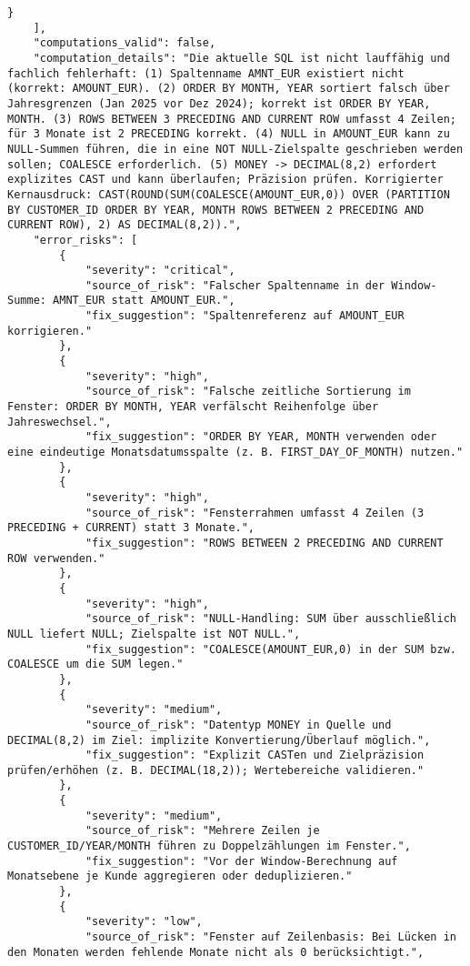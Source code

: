 \begin{lstlisting}[caption={Ausgabe: GPT-5 Anwendungsfall 8 Konsistenzdurchlauf},label={gpt_case8_prompt2}]
        }
    ],
    "computations_valid": false,
    "computation_details": "Die aktuelle SQL ist nicht lauffähig und fachlich fehlerhaft: (1) Spaltenname AMNT_EUR existiert nicht (korrekt: AMOUNT_EUR). (2) ORDER BY MONTH, YEAR sortiert falsch über Jahresgrenzen (Jan 2025 vor Dez 2024); korrekt ist ORDER BY YEAR, MONTH. (3) ROWS BETWEEN 3 PRECEDING AND CURRENT ROW umfasst 4 Zeilen; für 3 Monate ist 2 PRECEDING korrekt. (4) NULL in AMOUNT_EUR kann zu NULL-Summen führen, die in eine NOT NULL-Zielspalte geschrieben werden sollen; COALESCE erforderlich. (5) MONEY -> DECIMAL(8,2) erfordert explizites CAST und kann überlaufen; Präzision prüfen. Korrigierter Kernausdruck: CAST(ROUND(SUM(COALESCE(AMOUNT_EUR,0)) OVER (PARTITION BY CUSTOMER_ID ORDER BY YEAR, MONTH ROWS BETWEEN 2 PRECEDING AND CURRENT ROW), 2) AS DECIMAL(8,2)).",
    "error_risks": [
        {
            "severity": "critical",
            "source_of_risk": "Falscher Spaltenname in der Window-Summe: AMNT_EUR statt AMOUNT_EUR.",
            "fix_suggestion": "Spaltenreferenz auf AMOUNT_EUR korrigieren."
        },
        {
            "severity": "high",
            "source_of_risk": "Falsche zeitliche Sortierung im Fenster: ORDER BY MONTH, YEAR verfälscht Reihenfolge über Jahreswechsel.",
            "fix_suggestion": "ORDER BY YEAR, MONTH verwenden oder eine eindeutige Monatsdatumsspalte (z. B. FIRST_DAY_OF_MONTH) nutzen."
        },
        {
            "severity": "high",
            "source_of_risk": "Fensterrahmen umfasst 4 Zeilen (3 PRECEDING + CURRENT) statt 3 Monate.",
            "fix_suggestion": "ROWS BETWEEN 2 PRECEDING AND CURRENT ROW verwenden."
        },
        {
            "severity": "high",
            "source_of_risk": "NULL-Handling: SUM über ausschließlich NULL liefert NULL; Zielspalte ist NOT NULL.",
            "fix_suggestion": "COALESCE(AMOUNT_EUR,0) in der SUM bzw. COALESCE um die SUM legen."
        },
        {
            "severity": "medium",
            "source_of_risk": "Datentyp MONEY in Quelle und DECIMAL(8,2) im Ziel: implizite Konvertierung/Überlauf möglich.",
            "fix_suggestion": "Explizit CASTen und Zielpräzision prüfen/erhöhen (z. B. DECIMAL(18,2)); Wertebereiche validieren."
        },
        {
            "severity": "medium",
            "source_of_risk": "Mehrere Zeilen je CUSTOMER_ID/YEAR/MONTH führen zu Doppelzählungen im Fenster.",
            "fix_suggestion": "Vor der Window-Berechnung auf Monatsebene je Kunde aggregieren oder deduplizieren."
        },
        {
            "severity": "low",
            "source_of_risk": "Fenster auf Zeilenbasis: Bei Lücken in den Monaten werden fehlende Monate nicht als 0 berücksichtigt.",

\end{lstlisting}
